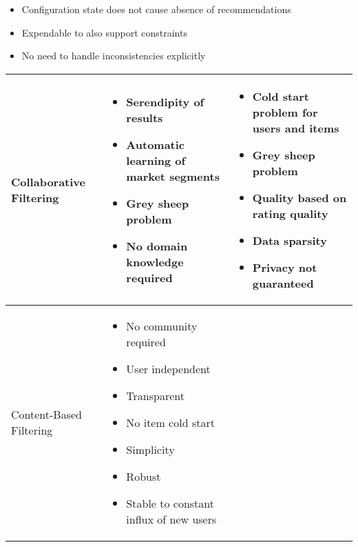 \begin{itemize}
    \item Configuration state does not cause absence of recommendations
    \item Expendable to also support constraints 
    \item No need to handle inconsistencies explicitly
\end{itemize}


\begin{table}
    \begin{center}
        \begin{tabularx}{\columnwidth}{X|X|X}
            \hline
            Collaborative Filtering 
            &   \begin{itemize}
                    \item Serendipity of results 
                    \item Automatic learning of market segments
                    \item Grey sheep problem
                    \item No domain knowledge required
                \end{itemize}
            &   \begin{itemize}
                    \item Cold start problem for users and items
                    \item Grey sheep problem
                    \item Quality based on rating quality
                    \item Data sparsity
                    \item Privacy not guaranteed
                \end{itemize} \\
            \hline
            Content-Based Filtering 
            &   \begin{itemize}
                    \item No community required 
                    \item User independent
                    \item Transparent
                    \item No item cold start
                    \item Simplicity
                    \item Robust
                    \item Stable to constant influx of new users

\end{itemize}
\end{tabularx}
\end{center}
\end{table}
